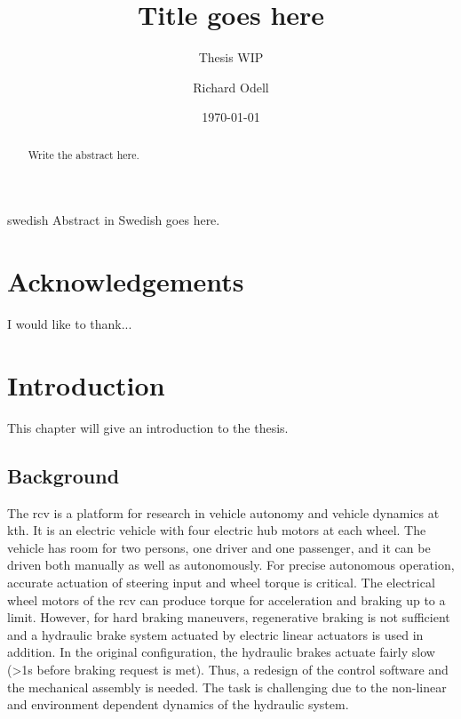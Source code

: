 \documentclass[a4paper,11pt]{kth-mag}
\title{Title goes here}
\subtitle{Thesis WIP}
\author{Richard Odell}
\date{\today}
\begin{document}
\frontmatter
\pagestyle{empty}
\removepagenumbers
\maketitle
{}


\clearpage
\begin{abstract}

Write the abstract here.

\end{abstract}
\clearpage
\begin{foreignabstract}{swedish}
Abstract in Swedish goes here.

\end{foreignabstract}
\clearpage

\chapter*{Acknowledgements}

I would like to thank...



\glsaddall
\printglossary
\renewcommand{\glsnamefont}[1]{\textbf{#1}}
\printglossary[type=\acronymtype,style=super,nonumberlist,nopostdot,nogroupskip]


\clearpage
\clearpage
\tableofcontents*
\clearpage
\listoffigures*
\clearpage
\listoftables*
\glsaddall



\mainmatter
\pagestyle{newchap}


\chapter{Introduction}

This chapter will give an introduction to the thesis. 

\section{Background}
The \gls{rcv} is a platform for research in vehicle autonomy and vehicle dynamics at \gls{kth}. It is an electric vehicle with four electric hub motors at each wheel. The vehicle has room for two persons, one driver and one passenger, and it can be driven both manually as well as autonomously. For precise autonomous operation, accurate actuation of steering input and wheel torque is critical. The electrical wheel motors of the \gls{rcv} can produce torque for acceleration and braking up to a limit. However, for hard braking maneuvers, regenerative braking is not sufficient and a hydraulic brake system actuated by electric linear actuators is used in addition. In the original configuration, the hydraulic brakes actuate fairly slow (>1s before braking request is met). Thus, a redesign of the control software and the mechanical assembly is needed. The task is challenging due to the non-linear and environment dependent dynamics of the hydraulic system.
\end{document}
